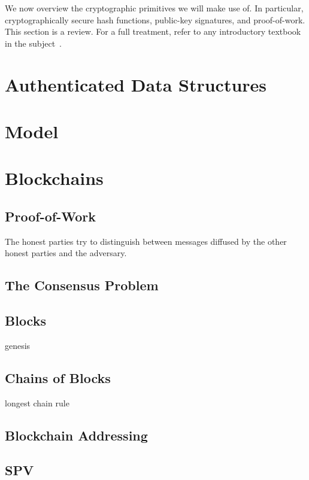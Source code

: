 We now overview the cryptographic primitives we will make use of. In particular,
cryptographically secure hash functions, public-key signatures, and
proof-of-work. This section is a review. For a full
treatment, refer to any introductory textbook in the subject~\cite{katz,handbook,foundations1,foundations2}.





\section{Authenticated Data Structures}


\section{Model}



\section{Blockchains}
\subsection{Proof-of-Work}
\cite{pow}
The
honest parties try to distinguish between messages diffused by the other honest
parties and the adversary.

\subsection{The Consensus Problem}
\subsection{Blocks}
genesis
\subsection{Chains of Blocks}
longest chain rule
\subsection{Blockchain Addressing}
\subsection{SPV}

